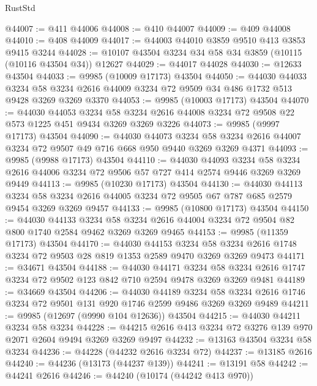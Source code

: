 \begin{lexlean}{RustStd}
\begin{coremodule}
@44007 := @411 @44006
@44008 := @410 @44007
@44009 := @409 @44008
@44010 := @408 @44009
@44017 := @44003 @44010 @3859 @9510 @413 @3853 @9415 @3244
@44028 := @10107 @43504 @3234 @34 @58 @34 @3859 (@10115 (@10116 @43504 @34)) @12627
@44029 := @44017 @44028
@44030 := @12633 @43504
@44033 := @9985 (@10009 @17173) @43504
@44050 := @44030
    @44033
    @3234
    @58
    @3234
    @2616
    @44009
    @3234
    @72
    @9509
    @34
    @486
    @1732
    @513
    @9428
    @3269
    @3269
    @3370
@44053 := @9985 (@10003 @17173) @43504
@44070 := @44030
    @44053
    @3234
    @58
    @3234
    @2616
    @44008
    @3234
    @72
    @9508
    @22
    @573
    @1225
    @451
    @9434
    @3269
    @3269
    @3226
@44073 := @9985 (@9997 @17173) @43504
@44090 := @44030
    @44073
    @3234
    @58
    @3234
    @2616
    @44007
    @3234
    @72
    @9507
    @49
    @716
    @668
    @950
    @9440
    @3269
    @3269
    @4371
@44093 := @9985 (@9988 @17173) @43504
@44110 := @44030
    @44093
    @3234
    @58
    @3234
    @2616
    @44006
    @3234
    @72
    @9506
    @57
    @727
    @414
    @2574
    @9446
    @3269
    @3269
    @9449
@44113 := @9985 (@10230 @17173) @43504
@44130 := @44030
    @44113
    @3234
    @58
    @3234
    @2616
    @44005
    @3234
    @72
    @9505
    @67
    @787
    @685
    @2579
    @9454
    @3269
    @3269
    @9457
@44133 := @9985 (@10800 @17173) @43504
@44150 := @44030
    @44133
    @3234
    @58
    @3234
    @2616
    @44004
    @3234
    @72
    @9504
    @82
    @800
    @1740
    @2584
    @9462
    @3269
    @3269
    @9465
@44153 := @9985 (@11359 @17173) @43504
@44170 := @44030
    @44153
    @3234
    @58
    @3234
    @2616
    @1748
    @3234
    @72
    @9503
    @28
    @819
    @1353
    @2589
    @9470
    @3269
    @3269
    @9473
@44171 := @34671 @43504
@44188 := @44030
    @44171
    @3234
    @58
    @3234
    @2616
    @1747
    @3234
    @72
    @9502
    @123
    @842
    @710
    @2594
    @9478
    @3269
    @3269
    @9481
@44189 := @34669 @43504
@44206 := @44030
    @44189
    @3234
    @58
    @3234
    @2616
    @1746
    @3234
    @72
    @9501
    @131
    @920
    @1746
    @2599
    @9486
    @3269
    @3269
    @9489
@44211 := @9985 (@12697 (@9990 @104 @12636)) @43504
@44215 := @44030 @44211 @3234 @58 @3234
@44228 := @44215 @2616 @413 @3234 @72 @3276 @139 @970 @2071 @2604 @9494 @3269 @3269 @9497
@44232 := @13163 @43504 @3234 @58 @3234
@44236 := @44228 (@44232 @2616 @3234 @72)
@44237 := @13185 @2616
@44240 := @44236 (@13173 (@44237 @139))
@44241 := @13191 @58
@44242 := @44241 @2616
@44246 := @44240 (@10174 (@44242 @413 @970))

\end{coremodule}
\end{lexlean}
